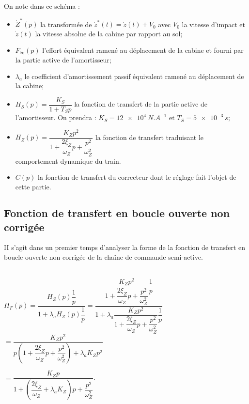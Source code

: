 On note dans ce schéma :
\begin{itemize}
\item $\dot{Z}^*(p)$ la transformée de $\dot{z}^*(t)=\dot{z}(t)+V_0$  avec $V_0$ la vitesse d'impact et $\dot{z}(t)$ la vitesse absolue de la cabine par rapport au sol;%
\item $F_{\text{éq}}(p)$  l'effort équivalent ramené au déplacement de la cabine et fourni par la partie active de l'amortisseur;%
\item $\lambda_a$ le coefficient d'amortissement passif équivalent ramené au déplacement de la cabine;
\item $H_S(p)=\dfrac{K_S}{1+T_Sp}$ la fonction de transfert de la partie active de l'amortisseur. %
On prendra : $K_S = \SI{12e4}{N.A^{-1}}$ et $T_S = \SI{5e-3}{s}$;
\item $H_Z(p)=\dfrac{K_Z p^2}{1+\dfrac{2\xi_Z}{\omega_Z}p+\dfrac{p^2}{\omega_Z^2}}$ la fonction de transfert traduisant le comportement dynamique du train.
\item $C(p)$ la fonction de transfert du correcteur dont le réglage fait l'objet de cette partie.
\end{itemize}
%
%
\fi


\subsection*{Fonction de transfert en boucle ouverte non corrigée}
\begin{obj}
II s'agit dans un premier temps d'analyser la forme de la fonction de transfert en boucle ouverte non corrigée de la chaîne de commande semi-active.
\end{obj}

\ifprof
\begin{corrige}~\\
$H_F(p) = \dfrac{H_Z(p)\dfrac{1}{p}}{1+\lambda_a H_Z(p)\dfrac{1}{p}}= \dfrac{\dfrac{K_Z p^2}{1+\dfrac{2\xi_Z}{\omega_Z}p+\dfrac{p^2}{\omega_Z^2}}\dfrac{1}{p}}{1+\lambda_a \dfrac{K_Z p^2}{1+\dfrac{2\xi_Z}{\omega_Z}p+\dfrac{p^2}{\omega_Z^2}}\dfrac{1}{p}}$
$= \dfrac{K_Z p^2}{p\left( 1+\dfrac{2\xi_Z}{\omega_Z}p+\dfrac{p^2}{\omega_Z^2} \right)+\lambda_a K_Z p^2}$

$= \dfrac{K_Z p}{ 1+\left(\dfrac{2\xi_Z}{\omega_Z}+\lambda_a K_Z\right)p+\dfrac{p^2}{\omega_Z^2} }$.
\end{corrige}
\else
\fi

